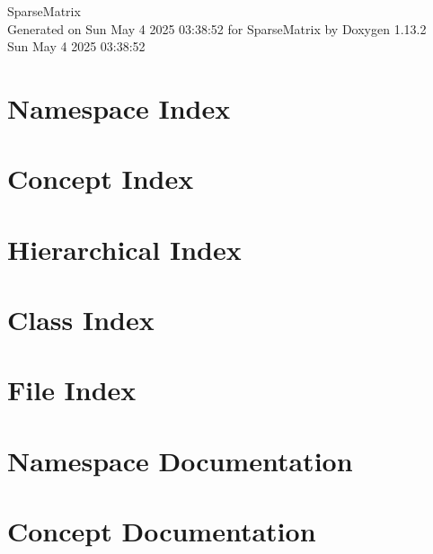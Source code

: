 \documentclass[twoside]{book}
\newcommand{\+}{\discretionary{\mbox{\scriptsize$\hookleftarrow$}}{}{}}
\newcommand{\clearemptydoublepage}{%
    \newpage{\pagestyle{empty}\cleardoublepage}%
  }
\begin{document}
  \raggedbottom
    \hypersetup{pageanchor=false,
                bookmarksnumbered=true,
                pdfencoding=unicode
               }
  \begin{titlepage}
  \vspace*{7cm}
  \begin{center}%
  {\Large Sparse\+Matrix}\\
  \vspace*{1cm}
  {\large Generated on Sun May 4 2025 03\+:38\+:52 for Sparse\+Matrix by Doxygen 1.13.2}\\
    \vspace*{0.5cm}
    {\small Sun May 4 2025 03:38:52}
  \end{center}
  \end{titlepage}
  \clearemptydoublepage
  \tableofcontents
  \clearemptydoublepage
  \hypersetup{pageanchor=true}

\chapter{Namespace Index}

\chapter{Concept Index}

\chapter{Hierarchical Index}

\chapter{Class Index}

\chapter{File Index}

\chapter{Namespace Documentation}



\chapter{Concept Documentation}



\end{document}
